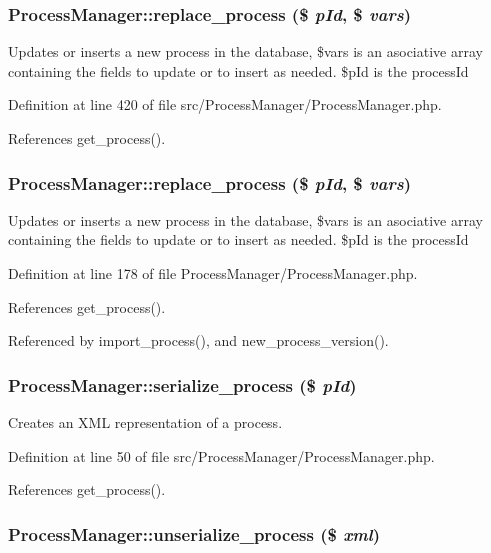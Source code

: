 \subsubsection{\setlength{\rightskip}{0pt plus 5cm}Process\-Manager::replace\_\-process (\$ {\em p\-Id}, \$ {\em vars})}\label{classProcessManager_a21}


Updates or inserts a new process in the database, \$vars is an asociative array containing the fields to update or to insert as needed. \$p\-Id is the process\-Id 

Definition at line 420 of file src/Process\-Manager/Process\-Manager.php.

References get\_\-process().
\subsubsection{\setlength{\rightskip}{0pt plus 5cm}Process\-Manager::replace\_\-process (\$ {\em p\-Id}, \$ {\em vars})}\label{classProcessManager_a8}


Updates or inserts a new process in the database, \$vars is an asociative array containing the fields to update or to insert as needed. \$p\-Id is the process\-Id 

Definition at line 178 of file Process\-Manager/Process\-Manager.php.

References get\_\-process().

Referenced by import\_\-process(), and new\_\-process\_\-version().
\subsubsection{\setlength{\rightskip}{0pt plus 5cm}Process\-Manager::serialize\_\-process (\$ {\em p\-Id})}\label{classProcessManager_a13}


Creates an XML representation of a process. 

Definition at line 50 of file src/Process\-Manager/Process\-Manager.php.

References get\_\-process().
\subsubsection{\setlength{\rightskip}{0pt plus 5cm}Process\-Manager::unserialize\_\-process (\$ {\em xml})}\label{classProcessManager_a14}


